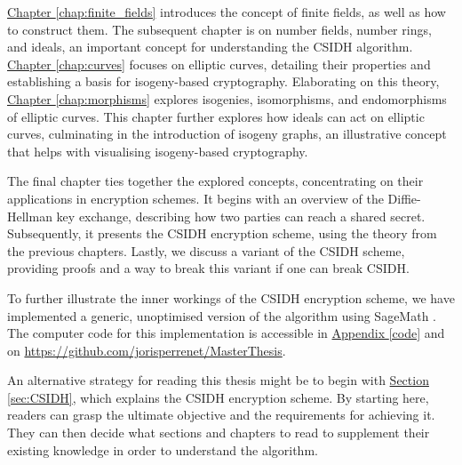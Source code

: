 \documentclass[openany, a4paper, 10pt]{book}
\theoremstyle{plain}
\theoremstyle{plain}
\theoremstyle{plain}
\theoremstyle{definition}
\theoremstyle{plain}
\theoremstyle{definition}
\theoremstyle{remark}
\newcommand{\secref}[1]{\hyperref[#1]{Section \ref{#1}}}
\newcommand{\chapref}[1]{\hyperref[#1]{Chapter \ref{#1}}}
\newcommand{\apref}[1]{\hyperref[#1]{Appendix \ref{#1}}}
\begin{document}
\chapref{chap:finite_fields} introduces the concept of finite fields, as well as how to construct them.
The subsequent chapter is on number fields, number rings, and ideals, an important concept for understanding the CSIDH algorithm.
\chapref{chap:curves} focuses on elliptic curves, detailing their properties and establishing a basis for isogeny-based cryptography.
Elaborating on this theory, \chapref{chap:morphisms} explores isogenies, isomorphisms, and endomorphisms of elliptic curves.
This chapter further explores how ideals can act on elliptic curves, culminating in the introduction of isogeny graphs, an illustrative concept that helps with visualising isogeny-based cryptography.

The final chapter ties together the explored concepts, concentrating on their applications in encryption schemes.
It begins with an overview of the Diffie-Hellman key exchange, describing how two parties can reach a shared secret.
Subsequently, it presents the CSIDH encryption scheme, using the theory from the previous chapters.
Lastly, we discuss a variant of the CSIDH scheme, providing proofs and a way to break this variant if one can break CSIDH.

To further illustrate the inner workings of the CSIDH encryption scheme, we have implemented a generic, unoptimised version of the algorithm using SageMath \cite{sagemath}.
The computer code for this implementation is accessible in \apref{code} and on \url{https://github.com/jorisperrenet/MasterThesis}.

An alternative strategy for reading this thesis might be to begin with \secref{sec:CSIDH}, which explains the CSIDH encryption scheme.
By starting here, readers can grasp the ultimate objective and the requirements for achieving it.
They can then decide what sections and chapters to read to supplement their existing knowledge in order to understand the algorithm.
\end{document}
